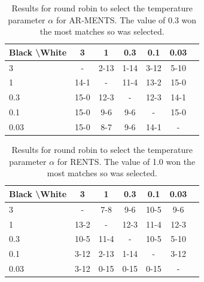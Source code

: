 \documentclass{article}
\theoremstyle{plain}
\begin{document}
\begin{appendices}
            \begin{table}[]
            \centering
                \begin{tabular}{l|cccccc}
                    \textbf{Black \textbackslash White}     & 3  & 1   & 0.3   & 0.1    & 0.03    \\ 
                    \hline
                                            3            & -     	&  2-13 		& 1-14  		& 3-12  		& 5-10  		\\
                                            1            &  14-1 		& -     	& 11-4 		& 13-2  		& 15-0  		\\
                                            0.3          &  15-0  	&  12-3  	&   -   &  12-3 		& 14-1  		\\
                                            0.1          &   15-0		&  9-6 		&  9-6 		& -     	&  15-0 		\\
                                            0.03         &   15-0		&  8-7 		&  9-6 		& 14-1  		&   -   	\\    
                \end{tabular}
                \caption{Results for round robin to select the temperature parameter $\alpha$ for AR-MENTS. The value of 0.3 won the most matches so was selected. \label{tab:x040}}
            \end{table}
            
            \begin{table}[]
            \centering
                \begin{tabular}{l|cccccc}
                    \textbf{Black \textbackslash White}     & 3  & 1   & 0.3   & 0.1    & 0.03    \\ 
                    \hline
                                            3            & -     	&   	7-8	&  9-6 		&  10-5 		&  9-6 		\\
                                            1            &  13-2 		& -     	& 12-3 		& 11-4  		&  12-3 		\\
                                            0.3          &   10-5 	& 11-4   	&   -   &  10-5 		&  5-10 		\\
                                            0.1          &   3-12		&  2-13 		& 1-14  		& -     	&  3-12 		\\
                                            0.03         &   3-12		&  0-15 		&  0-15 		&  0-15 		&   -   	\\    
                \end{tabular}
                \caption{Results for round robin to select the temperature parameter $\alpha$ for RENTS. The value of 1.0 won the most matches so was selected. \label{tab:w050}}
            \end{table}
            

\end{appendices}
\end{document}
